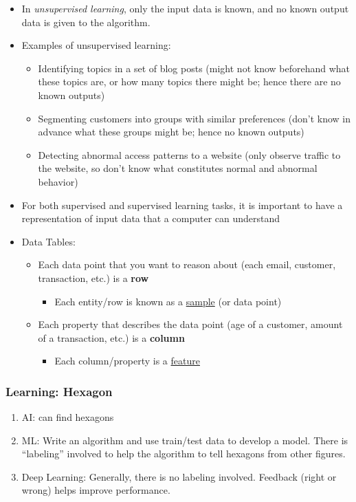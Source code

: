 \documentclass{article}
\begin{document}
\begin{itemize}
\begin{itemize}
\begin{itemize}
        \end{itemize}
    \end{itemize}
    \item In \textit{unsupervised learning}, only the input data is known, and no known output data is given to the algorithm.
    \item Examples of unsupervised learning:
    \begin{itemize}
        \item Identifying topics in a set of blog posts (might not know beforehand what these topics are, or how many topics there might be; hence there are no known outputs)
        \item Segmenting customers into groups with similar preferences (don't know in advance what these groups might be; hence no known outputs)
        \item Detecting abnormal access patterns to a website (only observe traffic to the website, so don't know what constitutes normal and abnormal behavior)
    \end{itemize}
    \item For both supervised and supervised learning tasks, it is important to have a representation of input data that a computer can understand
    \item Data Tables:
    \begin{itemize}
        \item Each data point that you want to reason about (each email, customer, transaction, etc.) is a \textbf{row}
        \begin{itemize}
            \item Each entity/row is known as a \underline{sample} (or data point)
        \end{itemize}
        \item Each property that describes the data point (age of a customer, amount of a transaction, etc.) is a \textbf{column}
        \begin{itemize}
            \item Each column/property is a \underline{feature}
        \end{itemize}
    \end{itemize}
\end{itemize}
\subsubsection*{Learning: Hexagon}
\begin{enumerate}
    \item AI: can find hexagons
    \item ML: Write an algorithm and use train/test data to develop a model. There is ``labeling'' involved to help the algorithm to tell hexagons from other figures.
    \item Deep Learning: Generally, there is no labeling involved. Feedback (right or wrong) helps improve performance.
\end{enumerate}
\end{document}
